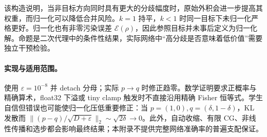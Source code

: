 该构造说明，当非目标方向同时具有更大的分歧幅度时，原始外积会进一步提高其权重，而归一化可以降低合并风险。$k=1$ 持平，$k<1$ 时同一目标下未归一化严格更好。归一化也有非零污染误差 $\mathcal E(\rho)$，因此参照目标并未事后定义为归一化解。命题是二次代理中的条件性结果，实际网络中“高分歧是否意味着低价值”需要独立干预检验。

\paragraph{实现与适用范围。}
使用 $\varepsilon=10^{-8}$ 并 detach 分母；实际 $p\to q$ 时修正趋零。数学证明要求正概率与精确算术，float32 下溢或 tiny clamp 触发时不直接沿用精确 Fisher 恒等式。学生自信但错误也可能使归一化压低重要修正：当 $p=(1,0),q=(\delta,1-\delta)$，KL 发散而 $\|(p-q)/\sqrt{D+\varepsilon}\|_2\sim\sqrt{2\delta}\to0$。此外，自动收缩、有限 CG、非线性传播和选步都会影响最终结果；本附录不提供完整网络准确率的普遍支配保证。
